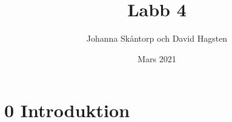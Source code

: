 \documentclass{article}
\title{Labb 4}
\author{Johanna Skåntorp och David Hagsten}
\date{Mars 2021}
\begin{document}
\maketitle
\section*{0 Introduktion}
\end{document}
